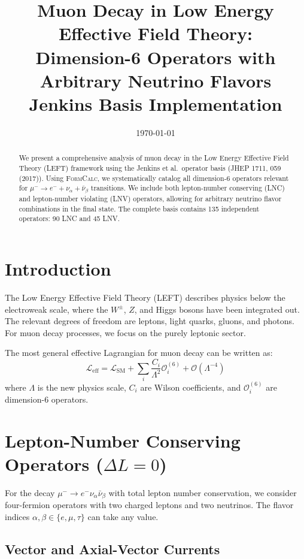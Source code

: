 \documentclass[11pt,a4paper]{article}
\title{Muon Decay in Low Energy Effective Field Theory:\\
Dimension-6 Operators with Arbitrary Neutrino Flavors\\
{\large Jenkins Basis Implementation}}
\author{}
\date{\today}
\newcommand{\formcalc}{\textsc{FormCalc}}
\begin{document}
\maketitle

\begin{abstract}
We present a comprehensive analysis of muon decay in the Low Energy Effective Field Theory (LEFT) framework using the Jenkins et al.\ operator basis (JHEP 1711, 059 (2017)). Using \formcalc{}, we systematically catalog all dimension-6 operators relevant for $\mu^- \to e^- + \nu_\alpha + \bar{\nu}_\beta$ transitions. We include both lepton-number conserving (LNC) and lepton-number violating (LNV) operators, allowing for arbitrary neutrino flavor combinations in the final state. The complete basis contains 135 independent operators: 90 LNC and 45 LNV.
\end{abstract}

\section{Introduction}

The Low Energy Effective Field Theory (LEFT) describes physics below the electroweak scale, where the $W^\pm$, $Z$, and Higgs bosons have been integrated out. The relevant degrees of freedom are leptons, light quarks, gluons, and photons. For muon decay processes, we focus on the purely leptonic sector.

The most general effective Lagrangian for muon decay can be written as:
\begin{equation}
\mathcal{L}_{\text{eff}} = \mathcal{L}_{\text{SM}} + \sum_i \frac{C_i}{\Lambda^2} \mathcal{O}_i^{(6)} + \mathcal{O}(\Lambda^{-4})
\end{equation}
where $\Lambda$ is the new physics scale, $C_i$ are Wilson coefficients, and $\mathcal{O}_i^{(6)}$ are dimension-6 operators.

\section{Lepton-Number Conserving Operators ($\Delta L = 0$)}

For the decay $\mu^- \to e^- \nu_\alpha \bar{\nu}_\beta$ with total lepton number conservation, we consider four-fermion operators with two charged leptons and two neutrinos. The flavor indices $\alpha, \beta \in \{e, \mu, \tau\}$ can take any value.

\subsection{Vector and Axial-Vector Currents}
\end{document}
